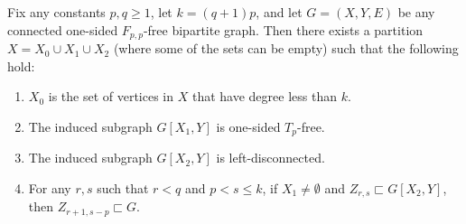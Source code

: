 \documentclass{article}
\begin{document}
\begin{lemma}
\label{lemma:Fpq structure}
Fix any constants $p,q \geq 1$, let $k = (q+1)p$, and let $G = (X,Y,E)$ be any
connected one-sided $F_{p,p}$-free bipartite graph. 
Then there exists a partition $X = X_0 \cup X_1 \cup X_2$ (where some of the sets can be empty) such that the following hold:
\begin{enumerate}[label=\textup{(\arabic*)}]
	\item $X_0$ is the set of vertices in $X$ that have degree less than $k$.
	\item The induced subgraph $G[X_1,Y]$ is one-sided $T_p$-free.
	\item The induced subgraph $G[X_2,Y]$ is left-disconnected.
	\item For any $r, s$ such that $r < q$ and $p < s \leq k$, if $X_1 \neq \emptyset$ and $Z_{r,s} \sqsubset G[X_2,Y]$, then $Z_{r+1,s-p} \sqsubset G$.
\end{enumerate}
\end{lemma}
\end{document}

